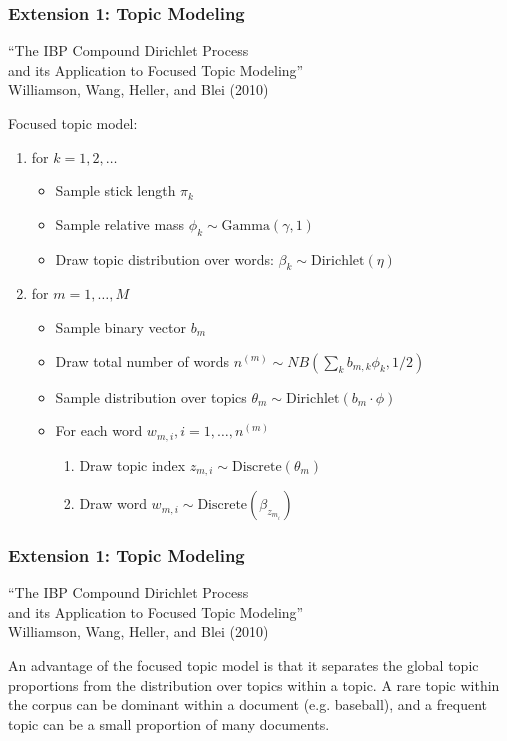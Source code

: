 \documentclass[13pt]{beamer}
\begin{document}
\begin{frame}
\frametitle{Extension 1: Topic Modeling}

\begin{center}
``The IBP Compound Dirichlet Process \\
and its Application to Focused Topic Modeling'' \\
Williamson, Wang, Heller, and Blei (2010)
\end{center}

Focused topic model:
\begin{enumerate}
\item for $k=1,2,\ldots$
  \begin{itemize}
  \item Sample stick length $\pi_k$
  \item Sample relative mass $\phi_k \sim \text{Gamma}(\gamma, 1)$
  \item Draw topic distribution over words: $\beta_k \sim \text{Dirichlet}(\eta)$
  \end{itemize}
\item for $m=1,\ldots,M$
  \begin{itemize}
  \item Sample binary vector $b_m$
  \item Draw total number of words $n^{(m)} \sim NB(\sum_k b_{m,k} \phi_k, 1/2)$
  \item Sample distribution over topics $\theta_m \sim \text{Dirichlet}(b_m \cdot \phi)$
  \item For each word $w_{m,i}, i=1,\ldots,n^{(m)}$
    \begin{enumerate}
    \item Draw topic index $z_{m,i} \sim \text{Discrete}(\theta_m)$ 
    \item Draw word $w_{m,i} \sim \text{Discrete}(\beta_{z_{m_i}})$
    \end{enumerate}
  \end{itemize}
\end{enumerate}

\end{frame}
\begin{frame}
\frametitle{Extension 1: Topic Modeling}

\begin{center}
``The IBP Compound Dirichlet Process \\
and its Application to Focused Topic Modeling'' \\
Williamson, Wang, Heller, and Blei (2010)
\end{center}

An advantage of the focused topic model is that it separates the global topic proportions from the distribution over topics within a topic. A rare topic within the corpus can be dominant within a document (e.g. baseball), and a frequent topic can be a small proportion of many documents.

\end{frame}
\end{document}

